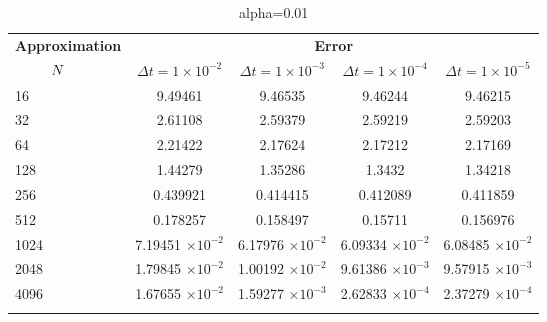 \begin{table}
\begin{tabular}{lcccc}
	\toprule
	\multicolumn{1}{c}{\textbf{Approximation}} & \multicolumn{4}{c}{\textbf{Error}} \\
	$\hspace{9mm}N$ & $\Delta t=1\times 10^{-2}$ & $\Delta t=1\times 10^{-3}$ & $\Delta t=1\times 10^{-4}$ & $\Delta t=1\times 10^{-5}$ \\
	\midrule
	\hspace{7mm} 16 & 9.49461   & 9.46535    & 9.46244     & 9.46215     \\
	\midrule
	\hspace{7mm} 32 & 2.61108   & 2.59379    & 2.59219     & 2.59203     \\
	\midrule
	\hspace{7mm} 64 & 2.21422   & 2.17624    & 2.17212     & 2.17169     \\
	\midrule
	\hspace{7mm} 128 & 1.44279   & 1.35286    & 1.3432      & 1.34218     \\
	\midrule
	\hspace{7mm} 256 & 0.439921  & 0.414415   & 0.412089    & 0.411859    \\
	\midrule
	\hspace{7mm} 512 & 0.178257  & 0.158497   & 0.15711     & 0.156976    \\
	\midrule
	\hspace{7mm} 1024 & 7.19451 $\times 10^{-2}$ & 6.17976 $\times 10^{-2}$  & 6.09334 $\times 10^{-2}$   & 6.08485 $\times 10^{-2}$   \\
	\midrule
	\hspace{7mm} 2048 & 1.79845 $\times 10^{-2}$ & 1.00192 $\times 10^{-2}$  & 9.61386 $\times 10^{-3}$  & 9.57915 $\times 10^{-3}$  \\
	\midrule
	\hspace{7mm} 4096 & 1.67655 $\times 10^{-2}$ & 1.59277 $\times 10^{-3}$ & 2.62833 $\times 10^{-4}$ & 2.37279 $\times 10^{-4}$ \\
	\\
	\bottomrule
\end{tabular}
\caption{alpha=0.01}
\end{table}

